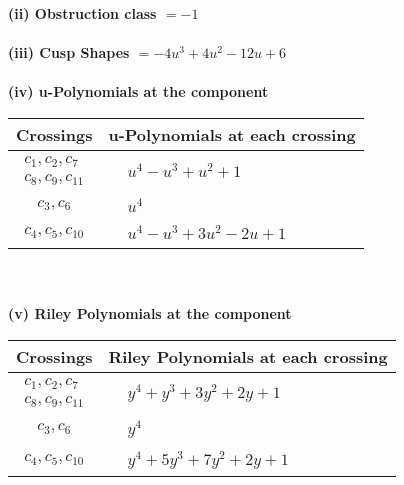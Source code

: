 \documentclass[1p]{elsarticle_modified}
\theoremstyle{definition}
\begin{document}
\flushleft \textbf{(ii) Obstruction class $= -1$}\\~\\
\flushleft \textbf{(iii) Cusp Shapes $= -4 u^3+4 u^2-12 u+6$}\\~\\
\newpage\renewcommand{\arraystretch}{1}
\flushleft \textbf{(iv) u-Polynomials at the component}\newline \\
\begin{tabular}{m{50pt}|m{274pt}}
Crossings & \hspace{64pt}u-Polynomials at each crossing \\
\hline $$\begin{aligned}c_{1},c_{2},c_{7}\\c_{8},c_{9},c_{11}\end{aligned}$$&$\begin{aligned}
&u^4- u^3+u^2+1
\end{aligned}$\\
\hline $$\begin{aligned}c_{3},c_{6}\end{aligned}$$&$\begin{aligned}
&u^4
\end{aligned}$\\
\hline $$\begin{aligned}c_{4},c_{5},c_{10}\end{aligned}$$&$\begin{aligned}
&u^4- u^3+3 u^2-2 u+1
\end{aligned}$\\
\hline
\end{tabular}\\~\\
\newpage\renewcommand{\arraystretch}{1}
\flushleft \textbf{(v) Riley Polynomials at the component}\newline \\
\begin{tabular}{m{50pt}|m{274pt}}
Crossings & \hspace{64pt}Riley Polynomials at each crossing \\
\hline $$\begin{aligned}c_{1},c_{2},c_{7}\\c_{8},c_{9},c_{11}\end{aligned}$$&$\begin{aligned}
&y^4+y^3+3 y^2+2 y+1
\end{aligned}$\\
\hline $$\begin{aligned}c_{3},c_{6}\end{aligned}$$&$\begin{aligned}
&y^4
\end{aligned}$\\
\hline $$\begin{aligned}c_{4},c_{5},c_{10}\end{aligned}$$&$\begin{aligned}
&y^4+5 y^3+7 y^2+2 y+1
\end{aligned}$\\
\hline
\end{tabular}\\~\\
\end{document}
